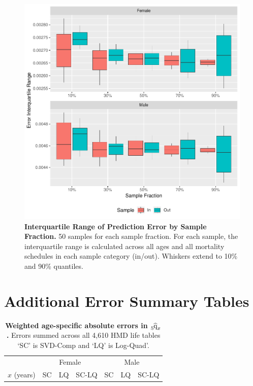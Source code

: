 \documentclass[11pt]{article}
\newcommand{\qfxhat}{\tensor*[_{5}]{\widehat{\mbox{q}}}{_{x}}}
\begin{document}
\begin{appendices}
\begin{figure}[htbp]
   \centering
   \includegraphics[width=\linewidth]{../figures/fig5b.pdf} 
   \captionsetup{format=plain,font=normalsize,margin=0cm,justification=justified}
   \caption{\textbf{Interquartile Range of Prediction Error by Sample Fraction.}  50 samples for each sample fraction.  For each sample, the interquartile range is calculated across all ages and all mortality schedules in each sample category (in/out).  Whiskers extend to 10\% and 90\% quantiles.}
   \label{fig:iqrSampErr}
\end{figure}


\newpage
\section{Additional Error Summary Tables} \label{app:errorTabs}

\begin{table}[htp]
\captionsetup{format=plain,font=normalsize,margin=1.9cm,justification=justified}
\caption{\textbf{Weighted age-specific absolute errors in $\qfxhat$.} Errors summed across all 4,610 HMD life tables `SC' is SVD-Comp and `LQ' is Log-Quad'.}
\begin{center}
\begin{tabular}{crrrrrr}
  \toprule
  & \multicolumn{3}{c}{Female} & \multicolumn{3}{c}{Male} \\
  \cmidrule(lr){2-4} \cmidrule(lr){5-7}
  $x$ (years) & \multicolumn{1}{c}{SC} & \multicolumn{1}{c}{LQ} & \multicolumn{1}{c}{SC-LQ} & \multicolumn{1}{c}{SC} & \multicolumn{1}{c}{LQ} & \multicolumn{1}{c}{SC-LQ} \\
  \midrule
  
  \midrule
  
   \bottomrule
\end{tabular}
\end{center}
\label{tab:qErrs}
\end{table}%


\end{appendices}
\end{document}
